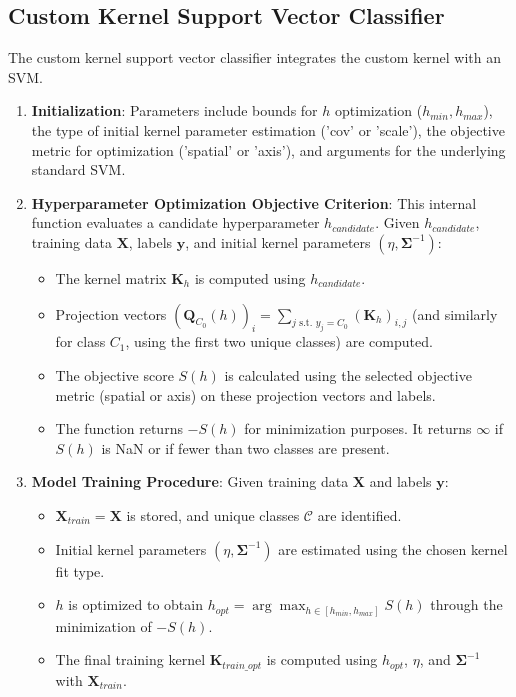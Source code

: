 \documentclass[conference]{IEEEtran}
\newcommand{\mat}[1]{\mathbf{#1}} %
\newcommand{\vecbf}[1]{\bm{#1}} %
\begin{document}
\subsection{Custom Kernel Support Vector Classifier}
The custom kernel support vector classifier integrates the custom kernel with an SVM.
\begin{enumerate}
    \item \textbf{Initialization}: Parameters include bounds for \(h\) optimization (\(h_{min}, h_{max}\)), the type of initial kernel parameter estimation ('cov' or 'scale'), the objective metric for optimization ('spatial' or 'axis'), and arguments for the underlying standard SVM.
    \item \textbf{Hyperparameter Optimization Objective Criterion}: This internal function evaluates a candidate hyperparameter \(h_{candidate}\). Given \(h_{candidate}\), training data \(\mat{X}\), labels \(\vecbf{y}\), and initial kernel parameters \((\eta, \mat{\Sigma}^{-1})\):
        \begin{itemize}
            \item The kernel matrix \(\mat{K}_h\) is computed using \(h_{candidate}\).
            \item Projection vectors \((\vecbf{Q}_{C_0}(h))_i = \sum_{j \text{ s.t. } y_j = C_0} (\mat{K}_h)_{i,j}\) (and similarly for class \(C_1\), using the first two unique classes) are computed.
            \item The objective score \(S(h)\) is calculated using the selected objective metric (spatial or axis) on these projection vectors and labels.
            \item The function returns \(-S(h)\) for minimization purposes. It returns \(\infty\) if \(S(h)\) is NaN or if fewer than two classes are present.
        \end{itemize}
    \item \textbf{Model Training Procedure}: Given training data \(\mat{X}\) and labels \(\vecbf{y}\):
        \begin{itemize}
            \item \(\mat{X}_{train} = \mat{X}\) is stored, and unique classes \(\mathcal{C}\) are identified.
            \item Initial kernel parameters \((\eta, \mat{\Sigma}^{-1})\) are estimated using the chosen kernel fit type.
            \item \(h\) is optimized to obtain \(h_{opt} = \arg\max_{h \in [h_{min}, h_{max}]} S(h)\) through the minimization of \(-S(h)\).
            \item The final training kernel \(\mat{K}_{train\_opt}\) is computed using \(h_{opt}\), \(\eta\), and \(\mat{\Sigma}^{-1}\) with \(\mat{X}_{train}\).

\end{itemize}
\end{enumerate}
\end{document}
